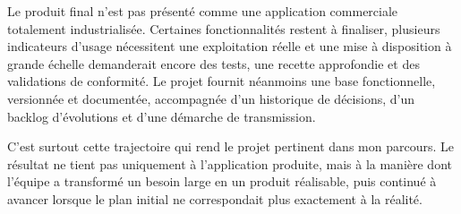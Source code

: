 Le produit final n'est pas présenté comme une application commerciale totalement industrialisée. Certaines fonctionnalités restent à finaliser, plusieurs indicateurs d'usage nécessitent une exploitation réelle et une mise à disposition à grande échelle demanderait encore des tests, une recette approfondie et des validations de conformité. Le projet fournit néanmoins une base fonctionnelle, versionnée et documentée, accompagnée d'un historique de décisions, d'un backlog d'évolutions et d'une démarche de transmission.

C'est surtout cette trajectoire qui rend le projet pertinent dans mon parcours. Le résultat ne tient pas uniquement à l'application produite, mais à la manière dont l'équipe a transformé un besoin large en un produit réalisable, puis continué à avancer lorsque le plan initial ne correspondait plus exactement à la réalité.
